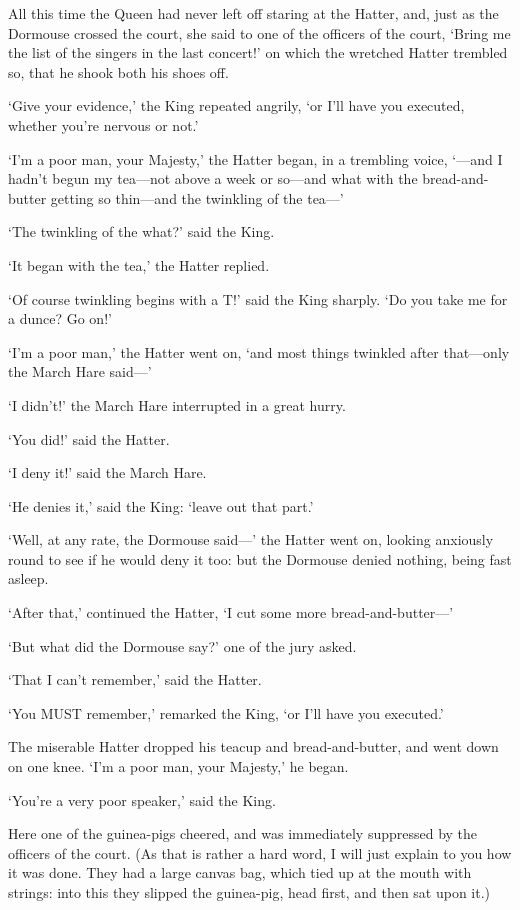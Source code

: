 \documentclass[12pt]{article}
\begin{document}
\begin{Parallel}[p]{}{}
{All this time the Queen had never left off staring at the Hatter, and, just as the Dormouse crossed the court, she said to one of the officers of the court, ‘Bring me the list of the singers in the last concert!’ on which the wretched Hatter trembled so, that he shook both his shoes off.

‘Give your evidence,’ the King repeated angrily, ‘or I’ll have you executed, whether you’re nervous or not.’

‘I’m a poor man, your Majesty,’ the Hatter began, in a trembling voice, ‘—and I hadn’t begun my tea—not above a week or so—and what with the bread-and-butter getting so thin—and the twinkling of the tea—’

‘The twinkling of the what?’ said the King.

‘It began with the tea,’ the Hatter replied.

‘Of course twinkling begins with a T!’ said the King sharply. ‘Do you take me for a dunce? Go on!’

‘I’m a poor man,’ the Hatter went on, ‘and most things twinkled after that—only the March Hare said—’

‘I didn’t!’ the March Hare interrupted in a great hurry.

‘You did!’ said the Hatter.

‘I deny it!’ said the March Hare.

‘He denies it,’ said the King: ‘leave out that part.’

‘Well, at any rate, the Dormouse said—’ the Hatter went on, looking anxiously round to see if he would deny it too: but the Dormouse denied nothing, being fast asleep.

‘After that,’ continued the Hatter, ‘I cut some more bread-and-butter—’

‘But what did the Dormouse say?’ one of the jury asked.

‘That I can’t remember,’ said the Hatter.

‘You MUST remember,’ remarked the King, ‘or I’ll have you executed.’

The miserable Hatter dropped his teacup and bread-and-butter, and went down on one knee. ‘I’m a poor man, your Majesty,’ he began.

‘You’re a very poor speaker,’ said the King.

Here one of the guinea-pigs cheered, and was immediately suppressed by the officers of the court. (As that is rather a hard word, I will just explain to you how it was done. They had a large canvas bag, which tied up at the mouth with strings: into this they slipped the guinea-pig, head first, and then sat upon it.)

}
\end{Parallel}
\end{document}
